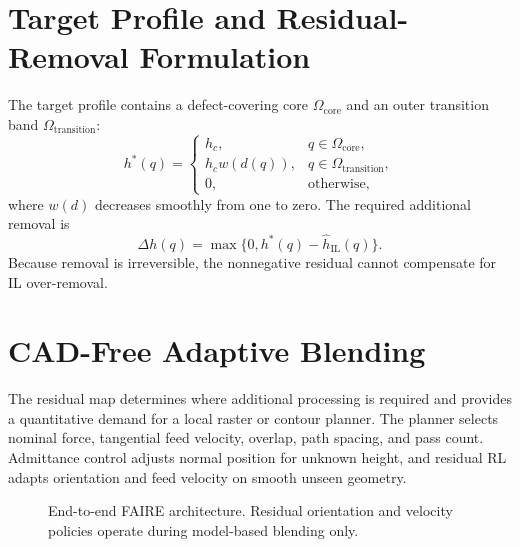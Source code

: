 \section{Target Profile and Residual-Removal Formulation}
The target profile contains a defect-covering core \(\Omega_{\mathrm{core}}\) and an outer transition band \(\Omega_{\mathrm{transition}}\):
\begin{equation}
  h^{*}(q)=
  \begin{cases}
    h_c, & q\in\Omega_{\mathrm{core}},\\
    h_c w(d(q)), & q\in\Omega_{\mathrm{transition}},\\
    0, & \text{otherwise},
  \end{cases}
  \label{eq:target_profile_overview}
\end{equation}
where \(w(d)\) decreases smoothly from one to zero. The required additional removal is
\begin{equation}
  \Delta h(q)=\max\{0,h^{*}(q)-\hat h_{\mathrm{IL}}(q)\}.
  \label{eq:residual_removal_overview}
\end{equation}
Because removal is irreversible, the nonnegative residual cannot compensate for IL over-removal.

\section{CAD-Free Adaptive Blending}
The residual map determines where additional processing is required and provides a quantitative demand for a local raster or contour planner. The planner selects nominal force, tangential feed velocity, overlap, path spacing, and pass count. Admittance control adjusts normal position for unknown height, and residual RL adapts orientation and feed velocity on smooth unseen geometry.

\begin{figure}[t]
  \centering
  \caption{End-to-end FAIRE architecture. Residual orientation and velocity policies operate during model-based blending only.}
  \label{fig:faire_architecture}
\end{figure}

